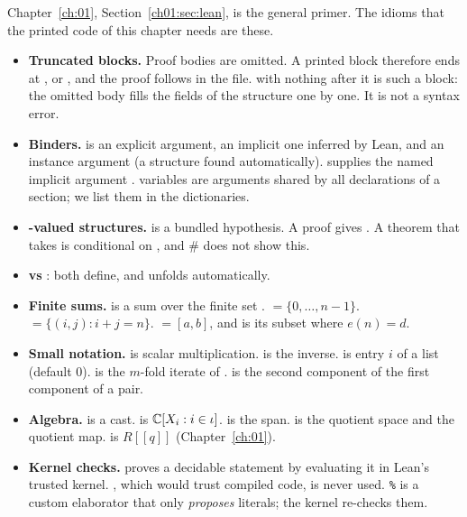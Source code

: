 Chapter~\ref{ch:01}, Section~\ref{ch01:sec:lean}, is the general primer. The idioms that the printed code of this
chapter needs are these.
\begin{itemize}
\item \textbf{Truncated blocks.} Proof bodies are omitted. A printed block therefore ends at \lean{:=},
   or , and the proof follows in the file.  with nothing after
  it is such a block: the omitted body fills the fields of the structure  one by one. It is not a syntax
  error.
\item \textbf{Binders.}  is an explicit argument,  an implicit one inferred by Lean, and
  \lean{[Field K]} an instance argument (a structure found automatically).  supplies the named
  implicit argument .  variables are arguments shared by all declarations of a section; we
  list them in the dictionaries.
\item \textbf{-valued structures.}  is a bundled hypothesis. A
  proof  gives . A theorem that takes  is conditional on , and
  \# does not show this.
\item \textbf{ vs }: both define, and  unfolds automatically.
\item \textbf{Finite sums.}  is a sum over the finite set . 
  $=\{0,\dots,n-1\}$.  $=\{(i,j):i+j=n\}$.  $=[a,b]$, and
   is its subset where $e(n)=d$.
\item \textbf{Small notation.}  is scalar multiplication.  is the inverse.  is
  entry $i$ of a list (default $0$).  is the $m$-fold iterate of .  is the second
  component of the first component of a pair.
\item \textbf{Algebra.}  is a cast.  is ${\mathbb{C}}[X_i:i\in\iota]$.
   is the span.  is the quotient space and  the quotient map.
   is $R[[q]]$ (Chapter~\ref{ch:01}).
\item \textbf{Kernel checks.}  proves a decidable statement by evaluating it in Lean's trusted
  kernel. , which would trust compiled code, is never used. \texttt{\%} is a custom
  elaborator that only \emph{proposes} literals; the kernel re-checks them.
\end{itemize}

